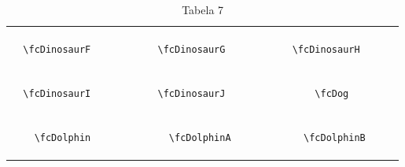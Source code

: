 \documentclass[x11names]{article}
\begin{document}
\begin{table}[H]
\begin{tabular}{|c|c|c|c|c|c|}
		&\multirow{5}{*}{	\fcDinosaurF	[scale=0.09]} & &\multirow{5}{*}{	\fcDinosaurG	[scale=0.09]} & &\multirow{5}{*}{	\fcDinosaurH	[scale=0.09]}\\	& & & & & \\	& & & & & \\	\verb|	\fcDinosaurF	| & & \verb|	\fcDinosaurG	| & & \verb|	\fcDinosaurH	| & \\	& & & & & \\	& & & & & \\	& & & & & \\	\hline									
		&\multirow{5}{*}{	\fcDinosaurI	[scale=0.09]} & &\multirow{5}{*}{	\fcDinosaurJ	[scale=0.09]} & &\multirow{5}{*}{	\fcDog	[scale=0.64]}\\	& & & & & \\	& & & & & \\	\verb|	\fcDinosaurI	| & & \verb|	\fcDinosaurJ	| & & \verb|	\fcDog	| & \\	& & & & & \\	& & & & & \\	& & & & & \\	\hline									
		&\multirow{5}{*}{	\fcDolphin	[scale=0.64]} & &\multirow{5}{*}{	\fcDolphinA	[scale=0.16]} & &\multirow{5}{*}{	\fcDolphinB	[scale=0.16]}\\	& & & & & \\	& & & & & \\	\verb|	\fcDolphin	| & & \verb|	\fcDolphinA	| & & \verb|	\fcDolphinB	| & \\	& & & & & \\	& & & & & \\	& & & & & \\		\hline 	\hline 	\end{tabular}	\caption{	Tabela 7	}\label{	Tab7	}\end{table}
\end{document}
